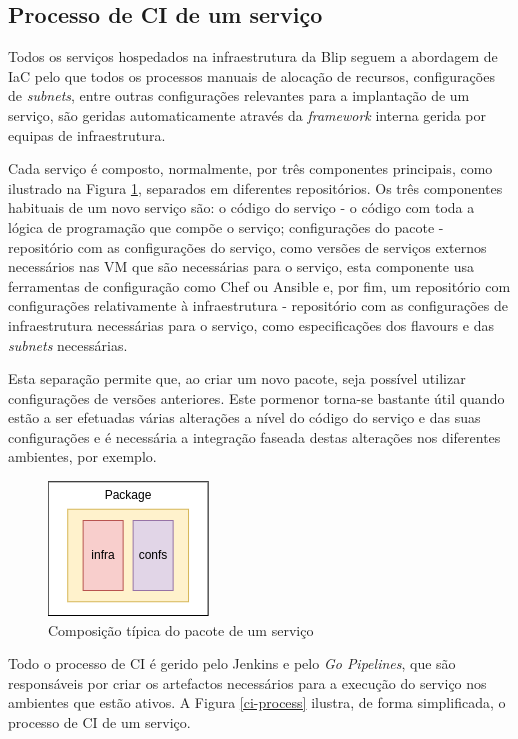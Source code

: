 \subsection{Processo de \ac{CI} de um serviço}

Todos os serviços hospedados na infraestrutura da Blip seguem a abordagem de \ac{IaC} pelo que 
todos os processos manuais de alocação de recursos, configurações de \textit{subnets}, entre 
outras configurações relevantes para a implantação de um serviço, são geridas automaticamente
através da \textit{framework} interna gerida por equipas de infraestrutura.

Cada serviço é composto, normalmente, por três componentes principais, como ilustrado na Figura
\ref{package}, separados em diferentes repositórios. Os três componentes habituais de um novo 
serviço são: o código do serviço - o código com toda a lógica de programação que compõe o serviço;
configurações do pacote - repositório com as configurações do serviço, como versões de serviços 
externos necessários nas \ac{VM} que são necessárias para o serviço, esta componente usa 
ferramentas de configuração como Chef \cite{chef} ou Ansible \cite{ansible} e, por fim, um 
repositório com configurações relativamente à infraestrutura - repositório com as configurações de 
infraestrutura necessárias para o serviço, como especificações dos \glspl{flavour} e das 
\textit{subnets} necessárias.

Esta separação permite que, ao criar um novo pacote, seja possível utilizar configurações de
versões anteriores. Este pormenor torna-se bastante útil quando estão a ser efetuadas várias
alterações a nível do código do serviço e das suas configurações e é necessária a integração 
faseada destas alterações nos diferentes ambientes, por exemplo.

\begin{figure}[H]
  \centerline{\includegraphics[scale=1.2]{media/content/impl/package.png}}
  \caption{Composição típica do pacote de um serviço}
  \label{package}
\end{figure}

Todo o processo de \ac{CI} é gerido pelo Jenkins e pelo \textit{Go Pipelines}, que são responsáveis
por criar os artefactos necessários para a execução do serviço nos ambientes que estão ativos. 
A Figura \ref{ci-process} ilustra, de forma simplificada, o processo de \ac{CI} de um serviço.

